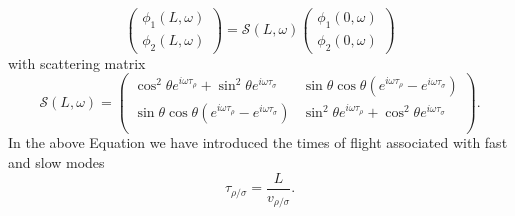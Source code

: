 \documentclass[12pt]{iopart}
\begin{document}
\begin{equation}
    \begin{pmatrix}
    \phi_{1}(L,\omega) \\
    \phi_{2}(L,\omega)
    \end{pmatrix}=\mathcal{S}(L,\omega)\begin{pmatrix}
    \phi_{1}(0,\omega) \\
    \phi_{2}(0,\omega)
    \end{pmatrix}
    \label{eq:phi-out}
\end{equation}
with scattering matrix
\begin{equation}
\mathcal{S}(L,\omega)=
\left( 
\begin{matrix}
\cos^{2}\theta e^{i \omega  \tau_{\rho}}+\sin^{2}\theta e^{i \omega \tau_{\sigma}} &  \sin \theta \cos \theta \left(e^{i \omega  \tau_{\rho}}-e^{i \omega  \tau_{\sigma}} \right)\\
\sin \theta \cos \theta \left(e^{i \omega \tau_{\rho}}-e^{i \omega  \tau_{\sigma}} \right)&  \sin^{2}\theta e^{i \omega \tau_{\rho}}+\cos^{2}\theta e^{i \omega \tau_{\sigma}}\\
\end{matrix}
\right).
\label{S_matrix}
\end{equation}
In the above Equation we have introduced the times of flight associated with fast and slow modes 
\begin{equation}
\tau_{\rho/\sigma}=\frac{L}{v_{\rho/\sigma}}.
\end{equation}
\end{document}
